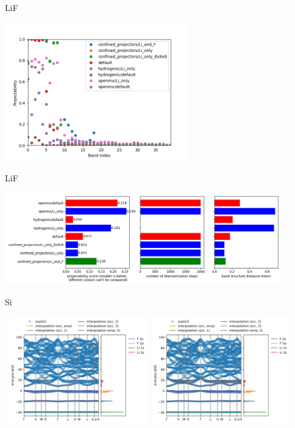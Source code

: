 \documentclass[xcolor=table,aspectratio=169]{beamer}
\numberwithin{equation}{section}
\begin{document}
\begin{frame}{LiF}
   \begin{center}
   \includegraphics[width=0.6\textwidth]{figures/vconf_tests/LiF/projectability.png}
   \end{center}
\end{frame}

\begin{frame}{LiF}
   \begin{center}
   \includegraphics[width=0.9\textwidth]{figures/vconf_tests/LiF/projectability_scores_nsteps_and_metric.png}
   \end{center}
\end{frame}

\begin{frame}{Si}
   \begin{center}
      \hbox{
      \includegraphics[width=0.45\textwidth]{figures/vconf_tests/LiF/default/62361_wannierization_wannierize_bandstructure.png}
      \raisebox{0.15\textwidth}{\huge $\rightarrow$}
      \includegraphics[width=0.45\textwidth]{figures/vconf_tests/LiF/confined_projectors/Li_only/62361_wannierization_wannierize_bandstructure.png}
      }
   \end{center}
\end{frame}
\end{document}
